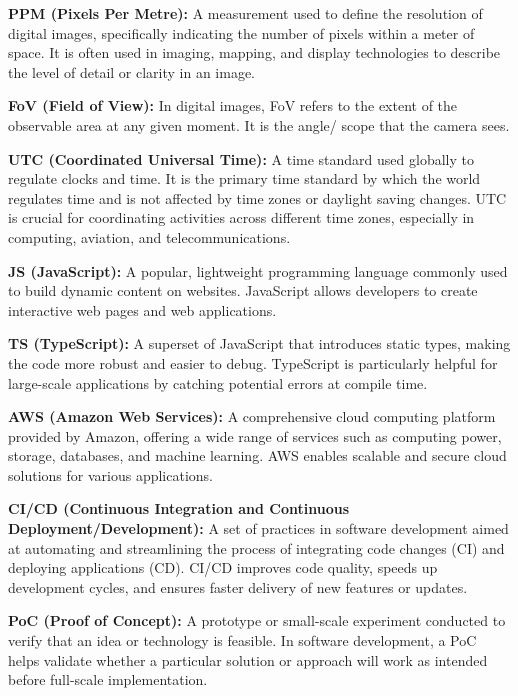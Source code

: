 \documentclass{scrreprt}
\theoremstyle{definition}
\begin{document}
\begin{flushleft}
    \item \textbf{PPM (Pixels Per Metre):} A measurement used to define the resolution of digital images, specifically indicating the number of pixels within a meter of space. It is often used in imaging, mapping, and display technologies to describe the level of detail or clarity in an image.\newline

    \item \textbf{FoV (Field of View):} In digital images, FoV refers to the extent of the observable area at any given moment. It is the angle/ scope that the camera sees.\newline

    \item \textbf{UTC (Coordinated Universal Time):} A time standard used globally to regulate clocks and time. It is the primary time standard by which the world regulates time and is not affected by time zones or daylight saving changes. UTC is crucial for coordinating activities across different time zones, especially in computing, aviation, and telecommunications.\newline

    \item \textbf{JS (JavaScript):} A popular, lightweight programming language commonly used to build dynamic content on websites. JavaScript allows developers to create interactive web pages and web applications.\newline

    \item \textbf{TS (TypeScript):} A superset of JavaScript that introduces static types, making the code more robust and easier to debug. TypeScript is particularly helpful for large-scale applications by catching potential errors at compile time.\newline

    \item \textbf{AWS (Amazon Web Services):} A comprehensive cloud computing platform provided by Amazon, offering a wide range of services such as computing power, storage, databases, and machine learning. AWS enables scalable and secure cloud solutions for various applications.\newline

    \item \textbf{CI/CD (Continuous Integration and Continuous Deployment/Development):} A set of practices in software development aimed at automating and streamlining the process of integrating code changes (CI) and deploying applications (CD). CI/CD improves code quality, speeds up development cycles, and ensures faster delivery of new features or updates.\newline

    \item \textbf{PoC (Proof of Concept):} A prototype or small-scale experiment conducted to verify that an idea or technology is feasible. In software development, a PoC helps validate whether a particular solution or approach will work as intended before full-scale implementation.\newline

\end{flushleft}
\end{document}
